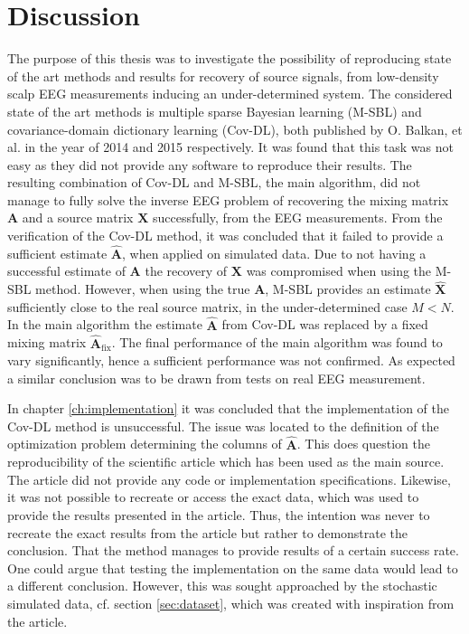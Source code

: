 \chapter{Discussion}
The purpose of this thesis was to investigate the possibility of reproducing state of the art methods and results for recovery of source signals, from low-density scalp EEG measurements inducing an under-determined system.
The considered state of the art methods is multiple sparse Bayesian learning (M-SBL)\cite{Balkan2014} and covariance-domain dictionary learning (Cov-DL)\cite{Balkan2015}, both published by O. Balkan, et al. in the year of 2014 and 2015 respectively. 
It was found that this task was not easy as they did not provide any software to reproduce their results. The resulting combination of Cov-DL and M-SBL, the main algorithm, did not manage to fully solve the inverse EEG problem of recovering the mixing matrix $\mathbf{A}$ and a source matrix $\mathbf{X}$ successfully, from the EEG measurements. 
From the verification of the Cov-DL method, it was concluded that it failed to provide a sufficient estimate $\hat{\mathbf{A}}$, when applied on simulated data. 
Due to not having a successful estimate of $\mathbf{A}$ the recovery of  $\mathbf{X}$ was compromised when using the M-SBL method.
However, when using the true $\mathbf{A}$, M-SBL provides an estimate $\hat{\mathbf{X}}$ sufficiently close to the real source matrix, in the under-determined case $M < N$. 
In the main algorithm the estimate $\hat{\mathbf{A}}$ from Cov-DL was replaced by a fixed mixing matrix $\hat{\mathbf{A}}_{\text{fix}}$. 
The final performance of the main algorithm was found to vary significantly, hence a sufficient performance was not confirmed. 
As expected a similar conclusion was to be drawn from tests on real EEG measurement. 

In chapter \ref{ch:implementation} it was concluded that the implementation of the Cov-DL method is unsuccessful.
The issue was located to the definition of the optimization problem determining the columns of $\hat{\mathbf{A}}$. 
This does question the reproducibility of the scientific article \cite{Balkan2015} which has been used as the main source. 
The article \cite{Balkan2015} did not provide any code or implementation specifications. 
Likewise, it was not possible to recreate or access the exact data, which was used to provide the results presented in the article. 
Thus, the intention was never to recreate the exact results from the article but rather to demonstrate the conclusion. That the method manages to provide results of a certain success rate. 
One could argue that testing the implementation on the same data would lead to a different conclusion. 
However, this was sought approached by the stochastic simulated data, cf. section \ref{sec:dataset}, which was created with inspiration from the article.

